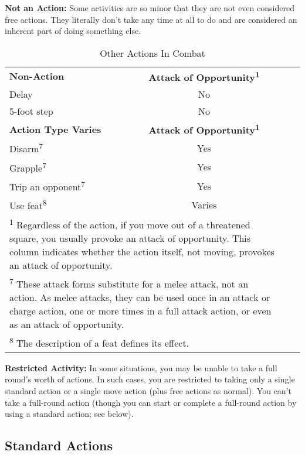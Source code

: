 \textbf{Not an Action:} Some activities are so minor that they are not even considered 
free actions. They literally don't take any time at all to do and are considered 
an inherent part of doing something else.

\begin{table}[htb]
\caption{Other Actions In Combat}
\centering
\begin{tabular}{l c l c}
\textbf{Non-Action} & \textbf{Attack of Opportunity\textsuperscript{1}}\\
Delay & No\\
5-foot step & No\\
\textbf{Action Type Varies} & \textbf{Attack of Opportunity\textsuperscript{1}}\\
Disarm\textsuperscript{7} & Yes\\
Grapple\textsuperscript{7} & Yes\\
Trip an opponent\textsuperscript{7} & Yes\\
Use feat\textsuperscript{8} & Varies\\
\multicolumn{2}{p{12.5cm}}{\textsuperscript{1} Regardless of the action, if you move out of a threatened square, you usually provoke an attack of opportunity. This column indicates whether the action itself, not moving, provokes an attack of opportunity.}\\
\multicolumn{2}{p{12.5cm}}{\textsuperscript{7} These attack forms substitute for a melee attack, not an action. As melee attacks, they can be used once in an attack or charge action, one or more times in a full attack action, or even as an attack of opportunity.}\\
\multicolumn{2}{p{12.5cm}}{\textsuperscript{8} The description of a feat defines its effect.}\\
\end{tabular}
\end{table}

\textbf{Restricted Activity:} In some situations, you may be unable to take a full 
round's worth of actions. In such cases, you are restricted to taking only a single 
standard action or a single move action (plus free actions as normal). You can't 
take a full-round action (though you can start or complete a full-round action 
by using a standard action; see below).

\subsection{Standard Actions}

